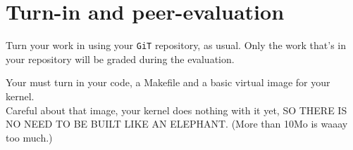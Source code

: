 \documentclass{42-en}
\begin{document}
\chapter{Turn-in and peer-evaluation}

    Turn your work in using your \texttt{GiT} repository, as
    usual. Only the work that's in your repository will be graded during
    the evaluation.

    Your must turn in your code, a Makefile and a basic virtual image for your
    kernel.\\
    Careful about that image, your kernel does nothing with it yet,
    SO THERE IS NO NEED TO BE BUILT LIKE AN ELEPHANT. (More than 10Mo is waaay
    too much.)

\end{document}
